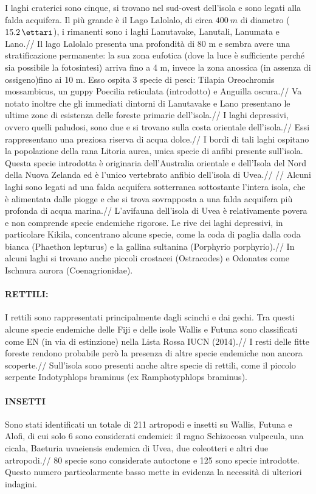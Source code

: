 \documentclass[fleqn,10pt]{SelfArx} %
\begin{document}
I laghi craterici sono cinque, si trovano nel sud-ovest dell'isola e sono legati alla falda acquifera. Il più grande è il Lago Lalolalo, di circa \(\SI{400}{m}\) di diametro ($\SI{15,2}{\ettari}$), i rimanenti sono i laghi Lanutavake, Lanutali, Lanumata e Lano.//
Il lago Lalolalo presenta una profondità di 80 m e sembra avere una stratificazione permanente: la sua zona eufotica (dove la luce è sufficiente perché sia possibile la fotosintesi) arriva fino a 4 m, invece la zona anossica (in assenza di ossigeno)fino ai 10 m. Esso ospita 3 specie di pesci: Tilapia Oreochromis mossambicus, un guppy Poecilia reticulata (introdotto) e Anguilla oscura.//
Va notato inoltre che gli immediati dintorni di Lanutavake e Lano presentano le ultime zone di esistenza delle foreste primarie dell'isola.//
I laghi depressivi, ovvero quelli paludosi, sono due e si trovano sulla costa orientale dell'isola.//
Essi rappresentano una preziosa riserva di acqua dolce.// 
I bordi di tali laghi  ospitano la popolazione della rana Litoria aurea, unica specie di anfibi presente sull'isola. Questa specie introdotta è originaria dell'Australia orientale e dell'Isola del Nord della Nuova Zelanda ed è l'unico vertebrato anfibio dell'isola di Uvea.//
//
Alcuni laghi sono legati ad una falda acquifera sotterranea sottostante l'intera isola, che è alimentata dalle piogge e che si trova sovrapposta a una falda acquifera più profonda di acqua marina.//
L'avifauna dell'isola di Uvea è relativamente povera e non comprende specie endemiche rigorose. Le rive dei laghi depressivi, in particolare Kikila, concentrano alcune specie, come la coda di paglia dalla coda bianca (Phaethon lepturus) e la gallina sultanina (Porphyrio porphyrio).//
In alcuni laghi si trovano anche piccoli crostacei (Ostracodes) e Odonates come Ischnura aurora (Coenagrionidae).

\paragraph{RETTILI:}
I rettili sono rappresentati principalmente dagli scinchi e dai gechi. 
Tra questi alcune specie endemiche delle Fiji e delle isole Wallis e Futuna sono classificati come EN (in via di estinzione) nella Lista Rossa IUCN (2014).//
I resti delle fitte foreste rendono probabile però la presenza di altre specie endemiche non ancora scoperte.//
Sull'isola sono presenti anche altre specie di rettili, come il piccolo serpente Indotyphlops braminus (ex Ramphotyphlops braminus).
 
\paragraph{INSETTI}
Sono stati identificati un totale di 211 artropodi e insetti su Wallis, Futuna e Alofi, di cui solo 6 sono considerati endemici: il ragno Schizocosa vulpecula, una cicala, Baeturia uvaeiensis endemica di Uvea, due coleotteri e altri due artropodi.//
80 specie sono considerate autoctone e 125 sono specie introdotte. Questo numero particolarmente basso mette in evidenza la necessità di ulteriori indagini.
 
\end{document}
